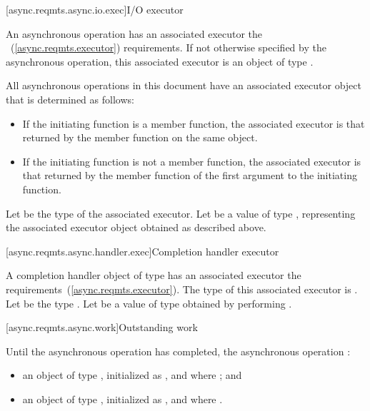 [async.reqmts.async.io.exec]{I/O executor}

%
\pnum
An asynchronous operation has an associated executor  the ~(\ref{async.reqmts.executor}) requirements. If not otherwise specified by the asynchronous operation, this associated executor is an object of type .

\pnum
 All asynchronous operations in this document have an associated executor object that is determined as follows:

\begin{itemize}
\item
If the initiating function is a member function, the associated executor is that returned by the  member function on the same object.

\item
If the initiating function is not a member function, the associated executor is that returned by the  member function of the first argument to the initiating function.
\end{itemize}

\pnum
Let  be the type of the associated executor. Let  be a value of type , representing the associated executor object obtained as described above.



[async.reqmts.async.handler.exec]{Completion handler executor}

\pnum
A completion handler object of type 
has an associated executor
 the  requirements~(\ref{async.reqmts.executor}).
The type of this associated executor is
.
Let  be the type
.
Let  be a value of type 
obtained by performing .



[async.reqmts.async.work]{Outstanding work}

%
\pnum
Until the asynchronous operation has completed, the asynchronous operation :

\begin{itemize}
\item
an object  of type , initialized as , and where ; and

\item
an object  of type , initialized as , and where .
\end{itemize}



